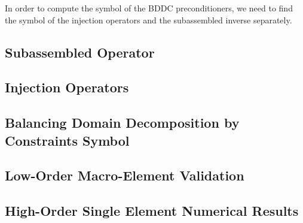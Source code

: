 In order to compute the symbol of the BDDC preconditioners, we need to find the symbol of the injection operators and the subassembled inverse separately.

\subsection{Subassembled Operator}


\subsection{Injection Operators}


\subsection{Balancing Domain Decomposition by Constraints Symbol}


\subsection{Low-Order Macro-Element Validation}


\subsection{High-Order Single Element Numerical Results}
